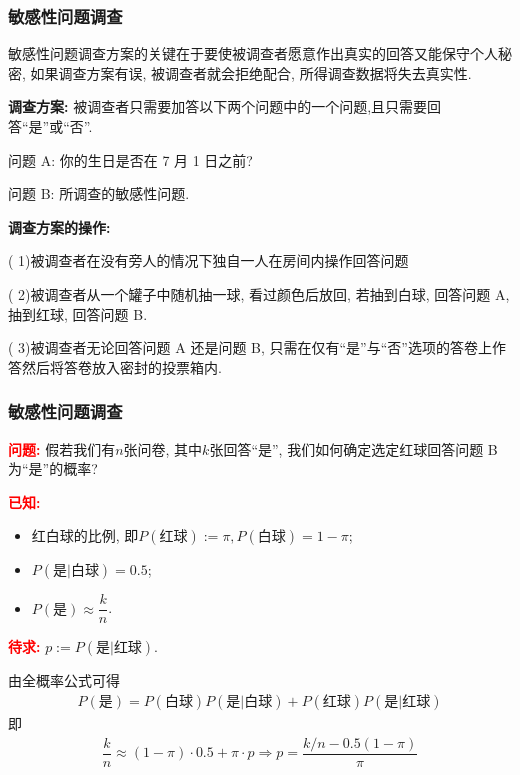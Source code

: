 \documentclass[Prob-All.tex]{subfiles}
\begin{document}
\begin{frame}
	\frametitle{敏感性问题调查}
	敏感性问题调查方案的关键在于要使被调查者愿意作出真实的回答又能保守个人秘密, 如果调查方案有误, 被调查者就会拒绝配合, 所得调查数据将失去真实性.
	\pause
	\vspace{0.5cm}

	{\bf 调查方案: } 被调查者只需要加答以下两个问题中的一个问题,且只需要回答“是”或“否”.

	\pause
	问题 A: 你的生日是否在 7 月 1 日之前?

	问题 B: 所调查的敏感性问题.

	\pause
	\vspace{0.5cm}
	{\bf 调查方案的操作: }

	( 1)被调查者在没有旁人的情况下独自一人在房间内操作回答问题

	\pause
	( 2)被调查者从一个罐子中随机抽一球, 看过颜色后放回, 若抽到白球, 回答问题 A, 抽到红球, 回答问题 B.

	( 3)被调查者无论回答问题 A 还是问题 B, 只需在仅有“是”与“否”选项的答卷上作答然后将答卷放入密封的投票箱内.

\end{frame}

\begin{frame}
	\frametitle{敏感性问题调查}
	{\bf \textcolor{red}{问题:}} 假若我们有$n$张问卷, 其中$k$张回答“是”, 我们如何确定选定红球回答问题 B 为“是”的概率?


	\pause
	{\bf \textcolor{red}{已知:}}
	\begin{itemize}[<+-|alert@+>]
		\item 红白球的比例, 即$P(\mbox{红球}):=\pi, P(\mbox{白球})=1-\pi$;
		\item $P(\mbox{是}|\mbox{白球})=0.5$;
		\item $P(\mbox{是})\approx \dfrac{k}{n}$.
	\end{itemize}
	\pause
	{\bf \textcolor{red}{待求:}} $p:=P(\mbox{是}|\mbox{红球})$.

	\pause
	{\bf\jieda} 由全概率公式可得
	\begin{eqnarray*}
		P(\mbox{是})=P(\mbox{白球})P(\mbox{是}|\mbox{白球})+P(\mbox{红球})P(\mbox{是}|\mbox{红球})
	\end{eqnarray*}
	即\pause
	\begin{eqnarray*}
		\dfrac{k}{n}\approx (1-\pi)\cdot 0.5+\pi\cdot p \Rightarrow p=\dfrac{k/n-0.5(1-\pi)}{\pi}
	\end{eqnarray*}


\end{frame}
\end{document}
